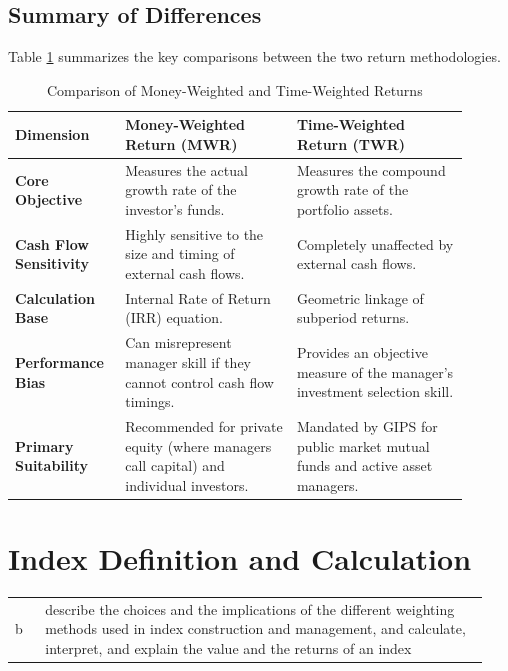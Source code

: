 \subsection{Summary of Differences}
	\label{subsec:Summary of Differences}
Table \ref{tab:mwr_vs_twr_differences} summarizes the key comparisons between the two return methodologies.

\begin{table}[!htbp]
\centering
\caption{Comparison of Money-Weighted and Time-Weighted Returns}
\label{tab:mwr_vs_twr_differences}
\begin{tabular}{p{0.2\linewidth} p{0.35\linewidth} p{0.35\linewidth}}
\toprule
\textbf{Dimension} & \textbf{Money-Weighted Return (MWR)} & \textbf{Time-Weighted Return (TWR)} \\
\midrule
\textbf{Core Objective} & Measures the actual growth rate of the investor's funds. & Measures the compound growth rate of the portfolio assets. \\
\textbf{Cash Flow Sensitivity} & Highly sensitive to the size and timing of external cash flows. & Completely unaffected by external cash flows. \\
\textbf{Calculation Base} & Internal Rate of Return (IRR) equation. & Geometric linkage of subperiod returns. \\
\textbf{Performance Bias} & Can misrepresent manager skill if they cannot control cash flow timings. & Provides an objective measure of the manager's investment selection skill. \\
\textbf{Primary Suitability} & Recommended for private equity (where managers call capital) and individual investors. & Mandated by GIPS for public market mutual funds and active asset managers. \\
\bottomrule
\end{tabular}
\end{table}

\section{Index Definition and Calculation}
\label{sec:Index Definition and Calculation}
\begin{center}
\begin{tabular}{p{0.06\linewidth} | p{0.88\linewidth}}
	b & describe the choices and the implications of the different weighting methods used in index construction and management, and calculate, interpret, and explain the value and the returns of an index \\
\end{tabular}
\end{center}

